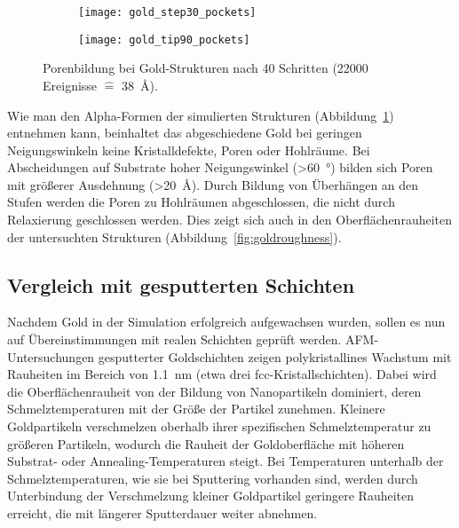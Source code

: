 \begin{figure}
  \captionsetup[subfigure]{singlelinecheck=false}
  \def\subfigwidth{0.49\textwidth}

  \begin{subfigure}[t]{\subfigwidth}
    \texttt{[image: gold\_step30\_pockets]}
    \label{fig:goldpockets-a}
  \end{subfigure}
  \hfill
  \begin{subfigure}[t]{\subfigwidth}
    \texttt{[image: gold\_tip90\_pockets]}
    \label{fig:goldpockets-b}
  \end{subfigure}

  \caption[Porenbildung bei Gold-Strukturen]{Porenbildung bei Gold-Strukturen nach 40 Schritten (\num{22000} Ereignisse $\hat{=}$ \SI{38}{\angstrom}).
  }
  \label{fig:goldpockets}
\end{figure}

Wie man den Alpha-Formen der simulierten Strukturen (Abbildung~\ref{fig:goldpockets-a}) entnehmen kann, beinhaltet das abgeschiedene Gold bei geringen Neigungswinkeln keine Kristalldefekte, Poren oder Hohlräume.
Bei Abscheidungen auf Substrate hoher Neigungswinkel (>\SI{60}{\degree}) bilden sich Poren mit größerer Ausdehnung (>\SI{20}{\angstrom}).
Durch Bildung von Überhängen an den Stufen werden die Poren zu Hohlräumen abgeschlossen, die nicht durch Relaxierung geschlossen werden.
Dies zeigt sich auch in den Oberflächenrauheiten der untersuchten Strukturen (Abbildung~\ref{fig:goldroughness}).

\subsection{Vergleich mit gesputterten Schichten}

Nachdem Gold in der Simulation erfolgreich aufgewachsen wurden, sollen es nun auf Übereinstimmungen mit realen Schichten geprüft werden.
AFM-Untersuchungen gesputterter Goldschichten zeigen polykristallines Wachstum mit Rauheiten im Bereich von \SI{1.1}{\nano\meter} (etwa drei fcc-Kristallschichten)\cite{svorcik_annealing_2011}.
Dabei wird die Oberflächenrauheit von der Bildung von Nanopartikeln dominiert, deren Schmelztemperaturen mit der Größe der Partikel zunehmen\cite{liu_melting_2001}.
Kleinere Goldpartikeln verschmelzen oberhalb ihrer spezifischen Schmelztemperatur zu größeren Partikeln, wodurch die Rauheit der Goldoberfläche mit höheren Substrat- oder Annealing-Temperaturen steigt.
Bei Temperaturen unterhalb der Schmelztemperaturen, wie sie bei Sputtering vorhanden sind, werden durch Unterbindung der Verschmelzung kleiner Goldpartikel geringere Rauheiten erreicht, die mit längerer Sputterdauer weiter abnehmen\cite{svorcik_annealing_2011}.

